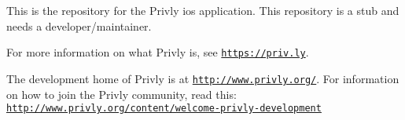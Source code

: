 This is the repository for the Privly ios application. This repository is a stub and needs a developer/maintainer.

For more information on what Privly is, see \href{https://priv.ly}{\tt https\-://priv.\-ly}.

The development home of Privly is at \href{http://www.privly.org/}{\tt http\-://www.\-privly.\-org/}. For information on how to join the Privly community, read this\-: \href{http://www.privly.org/content/welcome-privly-development}{\tt http\-://www.\-privly.\-org/content/welcome-\/privly-\/development} 